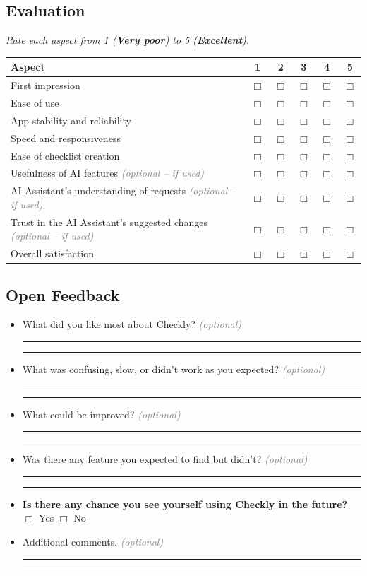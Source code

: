 \documentclass[11pt]{article}
\newcommand{\ansline}{\par\noindent\rule{\linewidth}{0.3pt}\par\vspace{0.5em}}
\newcommand{\ansblock}{\ansline\ansline}
\newcommand{\formnote}[1]{\textit{\textcolor{gray}{(#1)}}}
\begin{document}
\subsection*{Evaluation}

\textit{Rate each aspect from 1 (\textbf{Very poor}) to 5 (\textbf{Excellent}).}

\begingroup
\setlength{\tabcolsep}{3pt}
\renewcommand{\arraystretch}{1.12}
\small
\noindent\begin{tabularx}{\textwidth}{@{}YCCCCC@{}}
\toprule
Aspect & 1 & 2 & 3 & 4 & 5\\
\midrule
First impression & $\Box$ & $\Box$ & $\Box$ & $\Box$ & $\Box$\\
Ease of use & $\Box$ & $\Box$ & $\Box$ & $\Box$ & $\Box$\\
App stability and reliability & $\Box$ & $\Box$ & $\Box$ & $\Box$ & $\Box$\\
Speed and responsiveness & $\Box$ & $\Box$ & $\Box$ & $\Box$ & $\Box$\\
Ease of checklist creation & $\Box$ & $\Box$ & $\Box$ & $\Box$ & $\Box$\\
Usefulness of AI features \formnote{optional -- if used} & $\Box$ & $\Box$ & $\Box$ & $\Box$ & $\Box$\\
AI Assistant's understanding of requests \formnote{optional -- if used} & $\Box$ & $\Box$ & $\Box$ & $\Box$ & $\Box$\\
Trust in the AI Assistant's suggested changes \formnote{optional -- if used} & $\Box$ & $\Box$ & $\Box$ & $\Box$ & $\Box$\\
Overall satisfaction & $\Box$ & $\Box$ & $\Box$ & $\Box$ & $\Box$\\
\bottomrule
\end{tabularx}
\endgroup

\subsection*{Open Feedback}

\begin{itemize}[leftmargin=1.4em,itemsep=0.8em,label={}]
  \item What did you like most about Checkly? \formnote{optional}
  \ansblock

  \item What was confusing, slow, or didn’t work as you expected? \formnote{optional}
  \ansblock

  \item What could be improved? \formnote{optional}
  \ansblock

  \item Was there any feature you expected to find but didn't? \formnote{optional}
  \ansblock

  \item \textbf{Is there any chance you see yourself using Checkly in the future?}\\
  $\Box$ Yes \qquad $\Box$ No

  \item Additional comments. \formnote{optional}
  \ansblock
\end{itemize}
\end{document}
